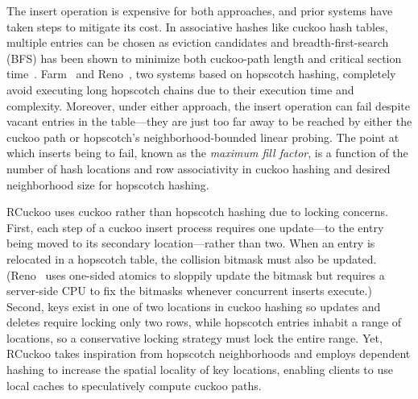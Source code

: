 The insert operation is expensive for both approaches, and prior
systems have taken steps to mitigate its cost.  In associative hashes
like cuckoo hash tables, multiple entries can be chosen as eviction
candidates and breadth-first-search (BFS) has been shown to minimize
both cuckoo-path length and critical section
time~\cite{memc3,cuckoo-improvements}.
Farm~\cite{farm} and Reno~\cite{reno}, two systems based on hopscotch
hashing, completely avoid executing long hopscotch chains due to their
execution time and complexity.  Moreover, under either approach, the
insert operation can fail despite vacant entries in the table---they
are just too far away to be reached by either the cuckoo path or
hopscotch's neighborhood-bounded linear probing.  The point at which
inserts being to fail, known as the \emph{maximum fill factor}, is a
function of the number of hash locations and row associativity in
cuckoo hashing and desired neighborhood size for hopscotch hashing.

RCuckoo uses cuckoo rather than hopscotch hashing due to locking
concerns.
First, each step of a cuckoo insert process requires one update---to
the entry being moved to its secondary location---rather than two.
When an entry is relocated in a hopscotch table, the collision bitmask
must also be updated.  (Reno~\cite{reno} uses one-sided atomics to
sloppily update the bitmask but requires a server-side CPU to fix the
bitmasks whenever concurrent inserts execute.)  Second, keys exist in
one of two locations in cuckoo hashing so updates and deletes require
locking only two rows, while hopscotch entries inhabit a range of
locations, so a conservative locking strategy must lock the entire
range.  Yet, RCuckoo takes inspiration from hopscotch neighborhoods and employs dependent hashing to increase the spatial
locality of key locations, enabling clients to use local
caches to speculatively compute cuckoo paths.




